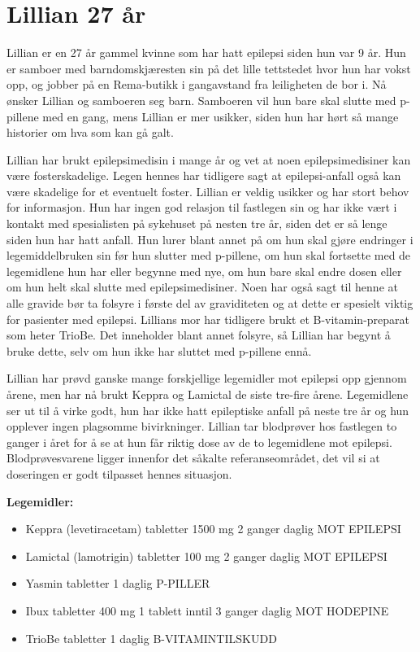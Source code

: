 \chapter{Lillian 27 år} \label{chap:lillian}
Lillian er en 27 år gammel kvinne som har hatt epilepsi siden hun var 9 år. Hun er samboer med barndomskjæresten sin på det lille tettstedet hvor hun har vokst opp, og jobber på en Rema-butikk i gangavstand fra leiligheten de bor i. Nå ønsker Lillian og samboeren seg barn. Samboeren vil hun bare skal slutte med p-pillene med en gang, mens Lillian er mer usikker, siden hun har hørt så mange historier om hva som kan gå galt. 

Lillian har brukt epilepsimedisin i mange år og vet at noen epilepsimedisiner kan være fosterskadelige. Legen hennes har tidligere sagt at epilepsi-anfall også kan være skadelige for et eventuelt foster. Lillian er veldig usikker og har stort behov for informasjon. Hun har ingen god relasjon til fastlegen sin og har ikke vært i kontakt med spesialisten på sykehuset på nesten tre år, siden det er så lenge siden hun har hatt anfall. Hun lurer blant annet på om hun skal gjøre endringer i legemiddelbruken sin før hun slutter med p-pillene, om hun skal fortsette med de legemidlene hun har eller begynne med nye, om hun bare skal endre dosen eller om hun helt skal slutte med epilepsimedisiner. Noen har også sagt til henne at alle gravide bør ta folsyre i første del av graviditeten og at dette er spesielt viktig for pasienter med epilepsi. Lillians mor har tidligere brukt et B-vitamin-preparat som heter TrioBe. Det inneholder blant annet folsyre, så Lillian har begynt å bruke dette, selv om hun ikke har sluttet med p-pillene ennå. 

Lillian har prøvd ganske mange forskjellige legemidler mot epilepsi opp gjennom årene, men har nå brukt Keppra og Lamictal de siste tre-fire årene. Legemidlene ser ut til å virke godt, hun har ikke hatt epileptiske anfall på neste tre år og hun opplever ingen plagsomme bivirkninger. Lillian tar blodprøver hos fastlegen to ganger i året for å se at hun får riktig dose av de to legemidlene mot epilepsi. Blodprøvesvarene ligger innenfor det såkalte referanseområdet, det vil si at doseringen er godt tilpasset hennes situasjon. 

\textbf{Legemidler:}
\begin{itemize}
\item Keppra (levetiracetam) tabletter 1500 mg 2 ganger daglig MOT EPILEPSI
\item Lamictal (lamotrigin) tabletter 100 mg 2 ganger daglig MOT EPILEPSI
\item Yasmin tabletter 1 daglig P-PILLER
\item Ibux tabletter 400 mg 1 tablett inntil 3 ganger daglig MOT HODEPINE 
\item TrioBe tabletter 1 daglig B-VITAMINTILSKUDD
\end{itemize}

